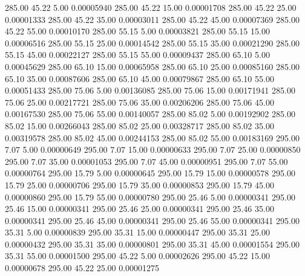     285.00     45.22      5.00     0.00005940
    285.00     45.22     15.00     0.00001708
    285.00     45.22     25.00     0.00001333
    285.00     45.22     35.00     0.00003011
    285.00     45.22     45.00     0.00007369
    285.00     45.22     55.00     0.00010170
    285.00     55.15      5.00     0.00003821
    285.00     55.15     15.00     0.00006516
    285.00     55.15     25.00     0.00014542
    285.00     55.15     35.00     0.00021290
    285.00     55.15     45.00     0.00022127
    285.00     55.15     55.00     0.00009437
    285.00     65.10      5.00     0.00045629
    285.00     65.10     15.00     0.00065958
    285.00     65.10     25.00     0.00085160
    285.00     65.10     35.00     0.00087606
    285.00     65.10     45.00     0.00079867
    285.00     65.10     55.00     0.00051433
    285.00     75.06      5.00     0.00136085
    285.00     75.06     15.00     0.00171941
    285.00     75.06     25.00     0.00217721
    285.00     75.06     35.00     0.00206206
    285.00     75.06     45.00     0.00167530
    285.00     75.06     55.00     0.00140057
    285.00     85.02      5.00     0.00192902
    285.00     85.02     15.00     0.00266043
    285.00     85.02     25.00     0.00328717
    285.00     85.02     35.00     0.00319578
    285.00     85.02     45.00     0.00244153
    285.00     85.02     55.00     0.00183169
    295.00      7.07      5.00     0.00000649
    295.00      7.07     15.00     0.00000633
    295.00      7.07     25.00     0.00000850
    295.00      7.07     35.00     0.00001053
    295.00      7.07     45.00     0.00000951
    295.00      7.07     55.00     0.00000764
    295.00     15.79      5.00     0.00000645
    295.00     15.79     15.00     0.00000578
    295.00     15.79     25.00     0.00000706
    295.00     15.79     35.00     0.00000853
    295.00     15.79     45.00     0.00000860
    295.00     15.79     55.00     0.00000780
    295.00     25.46      5.00     0.00000341
    295.00     25.46     15.00     0.00000341
    295.00     25.46     25.00     0.00000341
    295.00     25.46     35.00     0.00000341
    295.00     25.46     45.00     0.00000341
    295.00     25.46     55.00     0.00000341
    295.00     35.31      5.00     0.00000839
    295.00     35.31     15.00     0.00000447
    295.00     35.31     25.00     0.00000432
    295.00     35.31     35.00     0.00000801
    295.00     35.31     45.00     0.00001554
    295.00     35.31     55.00     0.00001500
    295.00     45.22      5.00     0.00002626
    295.00     45.22     15.00     0.00000678
    295.00     45.22     25.00     0.00001275

